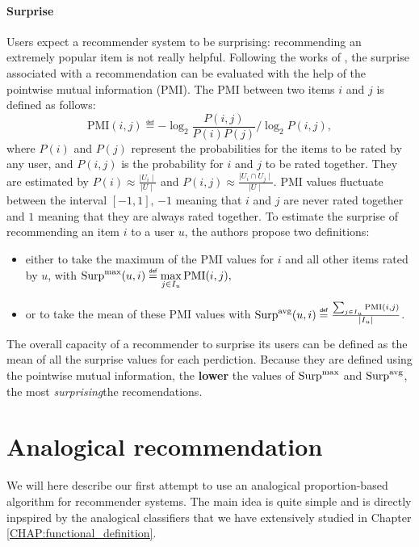 \paragraph{Surprise\\}
Users expect a recommender system to be surprising: recommending an extremely
popular item is not really helpful. Following the works of
\cite{KamBriRecSys2014}, the surprise associated with a recommendation can be evaluated with
the help of the pointwise mutual information (PMI). The PMI between two items
$i$ and $j$ is defined as follows:
$$\text{PMI}(i, j) \eqdef -\log_2 \frac{P(i, j)}{P(i)P(j)} / \log_2 P(i, j),$$
where $P(i)$ and $P(j)$  represent the probabilities for the items to be rated
by any user, and $P(i, j)$ is the probability for $i$ and $j$ to be rated
together. They are estimated by $P(i) \approx \frac{\mid U_i \mid}{\mid U
\mid}$ and $P(i, j) \approx \frac{\mid U_i \cap U_j \mid}{\mid U\mid}$. PMI
values fluctuate between the interval $[-1, 1]$, $-1$ meaning that $i$ and $j$
are never rated together and $1$ meaning that they are always rated together.
To estimate the surprise of recommending an item $i$ to a user $u$, the authors
propose two definitions:
\begin{itemize}
\item either to take the maximum of the PMI values for $i$ and all other items
  rated by $u$, with $\surpmax(u, i) \eqdef \max\limits_{j\in I_u}
    \text{PMI}(i, j),$
\item
 or to take the mean of these PMI values with $\surpavg(u, i) \eqdef
    \frac{\sum_{j \in I_u} \text{PMI}(i, j)}{\mid I_u\mid }$.
\end{itemize}

The overall capacity of a recommender to surprise its users can be defined as
the mean of all the surprise values for each perdiction. Because they are
defined using the pointwise mutual information, the \textbf{lower} the values
of $\text{Surp}^{\text{max}}$ and $\text{Surp}^{\text{avg}}$, the most \textit{surprising}the recomendations.

\section{Analogical recommendation}
\label{sec:analogical_recommendation}

We will here describe our first attempt to use an analogical proportion-based
algorithm for recommender systems. The main idea is quite simple and is
directly inpspired by the analogical classifiers that we have extensively
studied in Chapter \ref{CHAP:functional_definition}.

